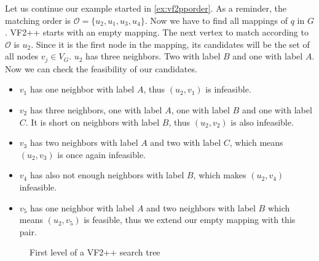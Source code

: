 \begin{example}
    Let us continue our example started in \ref{ex:vf2pporder}. As a reminder, the matching order is
    $\mathcal{O} = \{u_2, u_1, u_3, u_4\}$. Now we have to find all mappings of $q$ in $G$. VF2++ starts
    with an empty mapping. The next vertex to match according to $\mathcal{O}$ is $u_2$. Since it is
    the first node in the mapping, its candidates will be the set of all nodes $v_j \in V_G$. $u_2$ has
    three neighbors. Two with label $B$ and one with label $A$. Now we can check the feasibility of our
    candidates.

    \begin{itemize}
        \item $v_1$ has one neighbor with label $A$, thus $(u_2, v_1)$ is infeasible.
        \item $v_2$ has three neighbors, one with label $A$, one with label $B$ and one with label $C$. It is short on neighbors with label $B$, thus $(u_2, v_2)$ is also infeasible.
        \item $v_3$ has two neighbors with label $A$ and two with label $C$, which means $(u_2, v_3)$ is once again infeasible.
        \item $v_4$ has also not enough neighbors with label $B$, which makes $(u_2, v_4)$ infeasible.
        \item $v_5$ has one neighbor with label $A$ and two neighbors with label $B$ which means $(u_2, v_5)$ is feasible, thus we extend our empty mapping with this pair.
    \end{itemize}

    \begin{figure}[h!]
        \centering
        \caption{First level of a VF2++ search tree}
        \label{fig:vf2ppfirst}
    \end{figure}

\end{example}


